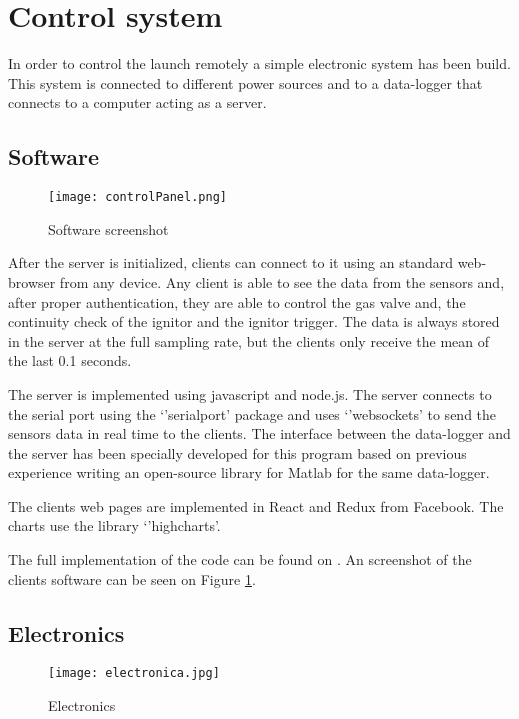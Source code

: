 
\section*{Control system}

In order to control the launch remotely a simple electronic system has been build. This system is connected to different power sources and to a data-logger that connects to a computer acting as a server.

\subsection*{Software}

\begin{figure}[H]
  \centering
  \texttt{[image: controlPanel.png]}
  \caption{Software screenshot}
  \label{fig:softwareScreenshot}
\end{figure}

After the server is initialized, clients can connect to it using an standard web-browser from any device. Any client is able to see the data from the sensors and, after proper authentication, they are able to control the gas valve and, the continuity check of the ignitor and the ignitor trigger. The data is always stored in the server at the full sampling rate, but the clients only receive the mean of the last 0.1 seconds.

The server is implemented using javascript and node.js. The server connects to the serial port using the `'serialport' package and uses `'websockets' to send the sensors data in real time to the clients. The interface between the data-logger and the server has been specially developed for this program based on previous experience writing an open-source library for Matlab for the same data-logger.

The clients web pages are implemented in React and Redux from Facebook. The charts use the library `'highcharts'.

The full implementation of the code can be found on \cite{hybridControlPanelGithub}. An screenshot of the clients software can be seen on Figure \ref{fig:softwareScreenshot}.

\subsection*{Electronics}

\begin{figure}[H]
  \centering
  \texttt{[image: electronica.jpg]}
  \caption{Electronics}
  \label{fig:electronica}
\end{figure}

